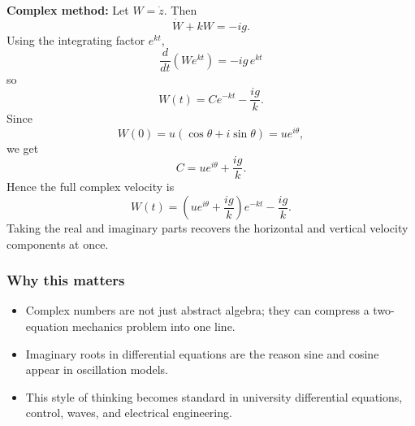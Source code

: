 \textbf{Complex method:} Let $W=\dot{z}$. Then
\[
\dot{W}+kW=-ig.
\]
Using the integrating factor $e^{kt}$,
\[
\frac{d}{dt}(We^{kt})=-ig\,e^{kt}
\]
so
\[
W(t)=Ce^{-kt}-\frac{ig}{k}.
\]
Since
\[
W(0)=u(\cos\theta+i\sin\theta)=ue^{i\theta},
\]
we get
\[
C=ue^{i\theta}+\frac{ig}{k}.
\]
Hence the full complex velocity is
\[
\boxed{W(t)=\left(ue^{i\theta}+\frac{ig}{k}\right)e^{-kt}-\frac{ig}{k}}.
\]
Taking the real and imaginary parts recovers the horizontal and vertical velocity components at once.

\subsubsection*{Why this matters}
\begin{itemize}[leftmargin=*]
  \item Complex numbers are not just abstract algebra; they can compress a two-equation mechanics problem into one line.
  \item Imaginary roots in differential equations are the reason sine and cosine appear in oscillation models.
  \item This style of thinking becomes standard in university differential equations, control, waves, and electrical engineering.
\end{itemize}
